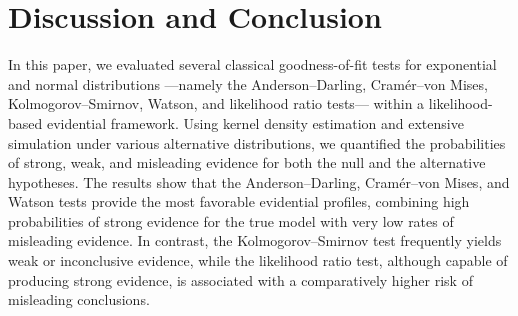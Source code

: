 \documentclass[twoside]{article}
\begin{document}
\section*{Discussion and Conclusion}  
In this paper, we evaluated several classical goodness-of-fit tests for exponential  and normal distributions —namely the Anderson–Darling, Cramér–von Mises, Kolmogorov–Smirnov, Watson, and likelihood ratio tests— within a likelihood-based evidential framework. Using kernel density estimation and extensive simulation under various alternative distributions, we quantified the probabilities of strong, weak, and misleading evidence for both the null and the alternative hypotheses.
The results show that the Anderson–Darling, Cramér–von Mises, and Watson tests provide the most favorable evidential profiles, combining high probabilities of strong evidence for the true model with very low rates of misleading evidence. In contrast, the Kolmogorov–Smirnov test frequently yields weak or inconclusive evidence, while the likelihood ratio test, although capable of producing strong evidence, is associated with a comparatively higher risk of misleading conclusions. %
\end{document}

